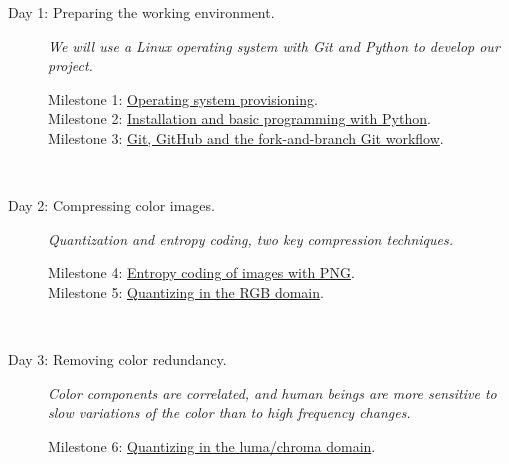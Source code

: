 \begin{description}
\item [Day 1: {\normalfont Preparing the working
    environment.}] \emph{We will use a Linux operating system with
  Git and Python to develop our project.}
  \begin{description}
  \item [Milestone 1: {\normalfont \href{https://sistemas-multimedia.github.io/milestones/01-provisioning/}{Operating system provisioning}.}]
  \item [Milestone 2: {\normalfont \href{https://sistemas-multimedia.github.io/milestones/02-python/}{Installation and basic programming with Python}.}]
  \item [Milestone 3: {\normalfont \href{https://sistemas-multimedia.github.io/milestones/03-git/}{Git, GitHub and the fork-and-branch Git workflow}.}]
  \end{description}
  ~\newline

\item [Day 2: {\normalfont Compressing color images.}] \emph{Quantization and entropy coding, two key compression techniques.}
  \begin{description}
  \item [Milestone 4: {\normalfont \href{https://sistemas-multimedia.github.io/milestones/04-Motion_PNG/}{Entropy coding of images with PNG}.}]
  \item [Milestone 5: {\normalfont \href{https://sistemas-multimedia.github.io/milestones/05-RGB_quantization/}{Quantizing in the RGB domain}.}]
  \end{description}
  ~\newline

\item [Day 3: {\normalfont Removing color redundancy.}] \emph{Color
    components are correlated, and human beings are more sensitive to
    slow variations of the color than to high frequency changes.}
  \begin{description}
   \item [Milestone 6: {\normalfont \href{https://sistemas-multimedia.github.io/milestones/06-YUV_quantization/}{Quantizing in the luma/chroma domain}.}]
  \end{description}
  ~\newline


\end{description}
